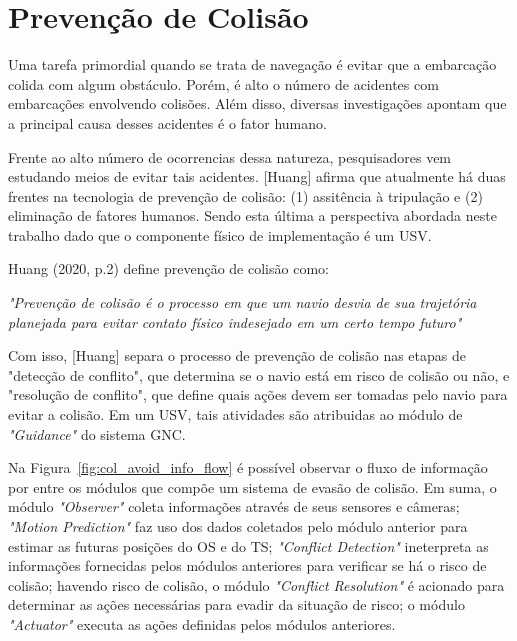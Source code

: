     
    \section{Prevenção de Colisão}\label{subchap2:prev_col}
        Uma tarefa primordial quando se trata de navegação é evitar que a embarcação colida com algum obstáculo. Porém, é alto o número de acidentes com embarcações envolvendo colisões. Além disso, diversas investigações apontam que a principal causa desses acidentes é o fator humano.~\cite{HUANG2020451}
        
        Frente ao alto número de ocorrencias dessa natureza, pesquisadores vem estudando meios de evitar tais acidentes. [Huang] afirma que atualmente há duas frentes na tecnologia de prevenção de colisão: (1) assitência à tripulação e (2) eliminação de fatores humanos. Sendo esta última a perspectiva abordada neste trabalho dado que o componente físico de implementação é um USV.~\cite{HUANG2020451}
        
        Huang (2020, p.2) define prevenção de colisão como:
        \begin{directcite}
            \textit{"Prevenção de colisão é o processo em que um navio desvia de sua trajetória planejada para evitar contato físico indesejado em um certo tempo futuro"}
        \end{directcite}
        
        Com isso, [Huang] separa o processo de prevenção de colisão nas etapas de "detecção de conflito", que determina se o navio está em risco de colisão ou não, e "resolução de conflito", que define quais ações devem ser tomadas pelo navio para evitar a colisão. Em um USV, tais atividades são atribuidas ao módulo de \textit{"Guidance"} do sistema GNC.~\cite{HUANG2020451}
        
        Na Figura~\ref{fig:col_avoid_info_flow} é possível observar o fluxo de informação por entre os módulos que compõe um sistema de evasão de colisão. Em suma, o módulo \textit{"Observer"} coleta informações através de seus sensores e câmeras; \textit{"Motion Prediction"} faz uso dos dados coletados pelo módulo anterior para estimar as futuras posições do OS e do TS; \textit{"Conflict Detection"} ineterpreta as informações fornecidas pelos módulos anteriores para verificar se há o risco de colisão; havendo risco de colisão, o módulo \textit{"Conflict Resolution"} é acionado para determinar as ações necessárias para evadir da situação de risco; o módulo \textit{"Actuator"} executa as ações definidas pelos módulos anteriores.~\cite{HUANG2020451}
        
